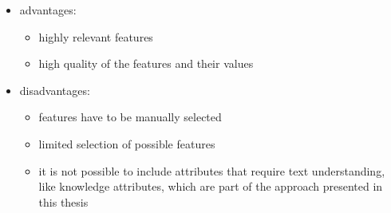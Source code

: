 \begin{itemize}
\begin{itemize}
          \item advantages:
                \begin{itemize}
                  \item highly relevant features
                  \item high quality of the features and their values
                \end{itemize}
          \item disadvantages:
                \begin{itemize}
                  \item features have to be manually selected
                  \item limited selection of possible features
                  \item it is not possible to include attributes that require text understanding, like knowledge attributes, which are part of the approach presented in this thesis
                \end{itemize}
        \end{itemize}
\end{itemize}


